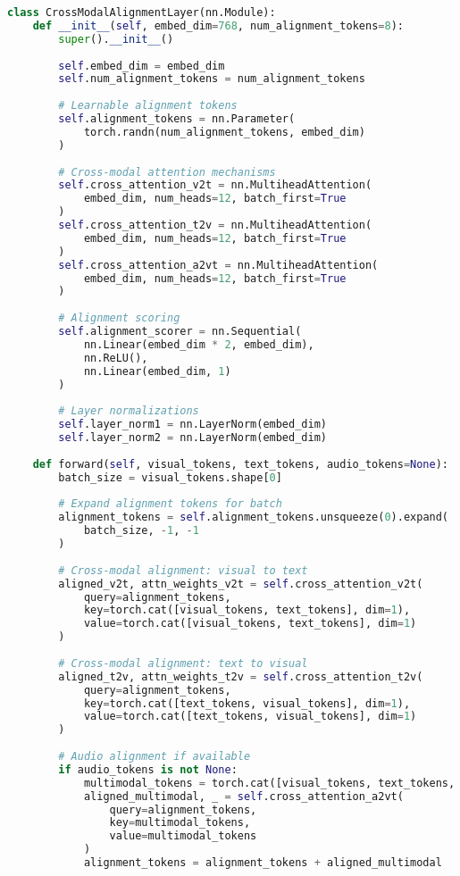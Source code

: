 \begin{lstlisting}[language=Python, caption=Cross-modal alignment architecture]
class CrossModalAlignmentLayer(nn.Module):
    def __init__(self, embed_dim=768, num_alignment_tokens=8):
        super().__init__()
        
        self.embed_dim = embed_dim
        self.num_alignment_tokens = num_alignment_tokens
        
        # Learnable alignment tokens
        self.alignment_tokens = nn.Parameter(
            torch.randn(num_alignment_tokens, embed_dim)
        )
        
        # Cross-modal attention mechanisms
        self.cross_attention_v2t = nn.MultiheadAttention(
            embed_dim, num_heads=12, batch_first=True
        )
        self.cross_attention_t2v = nn.MultiheadAttention(
            embed_dim, num_heads=12, batch_first=True
        )
        self.cross_attention_a2vt = nn.MultiheadAttention(
            embed_dim, num_heads=12, batch_first=True
        )
        
        # Alignment scoring
        self.alignment_scorer = nn.Sequential(
            nn.Linear(embed_dim * 2, embed_dim),
            nn.ReLU(),
            nn.Linear(embed_dim, 1)
        )
        
        # Layer normalizations
        self.layer_norm1 = nn.LayerNorm(embed_dim)
        self.layer_norm2 = nn.LayerNorm(embed_dim)
        
    def forward(self, visual_tokens, text_tokens, audio_tokens=None):
        batch_size = visual_tokens.shape[0]
        
        # Expand alignment tokens for batch
        alignment_tokens = self.alignment_tokens.unsqueeze(0).expand(
            batch_size, -1, -1
        )
        
        # Cross-modal alignment: visual to text
        aligned_v2t, attn_weights_v2t = self.cross_attention_v2t(
            query=alignment_tokens,
            key=torch.cat([visual_tokens, text_tokens], dim=1),
            value=torch.cat([visual_tokens, text_tokens], dim=1)
        )
        
        # Cross-modal alignment: text to visual
        aligned_t2v, attn_weights_t2v = self.cross_attention_t2v(
            query=alignment_tokens,
            key=torch.cat([text_tokens, visual_tokens], dim=1),
            value=torch.cat([text_tokens, visual_tokens], dim=1)
        )
        
        # Audio alignment if available
        if audio_tokens is not None:
            multimodal_tokens = torch.cat([visual_tokens, text_tokens, audio_tokens], dim=1)
            aligned_multimodal, _ = self.cross_attention_a2vt(
                query=alignment_tokens,
                key=multimodal_tokens,
                value=multimodal_tokens
            )
            alignment_tokens = alignment_tokens + aligned_multimodal
        

\end{lstlisting}
